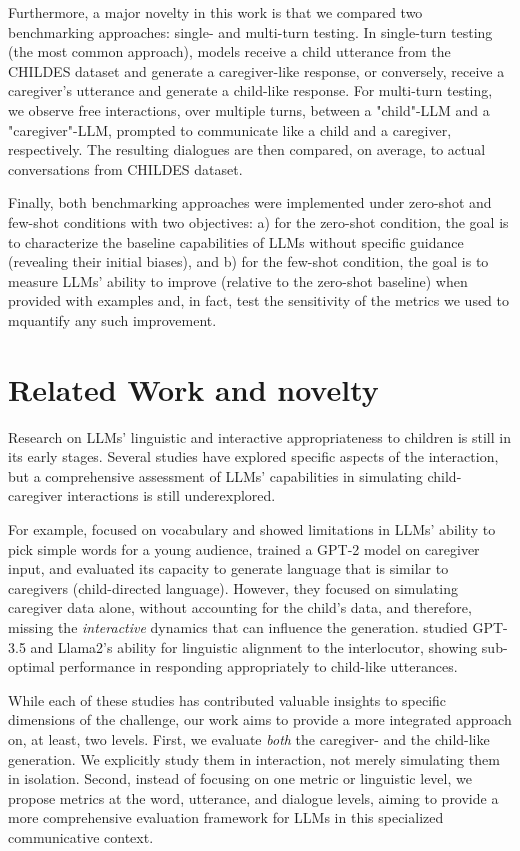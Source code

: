 Furthermore, a major novelty in this work is that we compared two benchmarking approaches: single- and multi-turn testing. In single-turn testing (the most common approach), models receive a child utterance from the CHILDES dataset and generate a caregiver-like response, or conversely, receive a caregiver's utterance and generate a child-like response. For multi-turn testing, we observe free interactions, over multiple turns, between a "child"-LLM and a "caregiver"-LLM, prompted to communicate like a child and a caregiver, respectively. The resulting dialogues are then compared, on average, to actual conversations from CHILDES dataset.

Finally, both benchmarking approaches were implemented under zero-shot and few-shot conditions with two objectives: a) for the zero-shot condition, the goal is to characterize the baseline capabilities of LLMs without specific guidance (revealing their initial biases), and b) for the few-shot condition, the goal is to measure LLMs' ability to improve (relative to the zero-shot baseline) when provided with examples and, in fact, test the sensitivity of the metrics we used to mquantify any such improvement.

\section{Related Work and novelty}

Research on LLMs' linguistic and interactive appropriateness to children is still in its early stages. Several studies have explored specific aspects of the interaction, but a comprehensive assessment of LLMs' capabilities in simulating child-caregiver interactions is still underexplored.

For example,  \citet{valentini2023automatic} focused on vocabulary and showed limitations in LLMs' ability to pick simple words for a young audience,
\citet{rasanen2024age} trained a GPT-2 model on caregiver input, and evaluated its capacity to generate language that is similar to caregivers (child-directed language). However, they focused on simulating caregiver data alone, without accounting for the child's data, and therefore, missing the \textit{interactive} dynamics that can influence the generation. \citet{french2024aligning} studied GPT-3.5 and Llama2's ability for linguistic alignment to the interlocutor, showing sub-optimal performance in responding appropriately to child-like utterances. 

While each of these studies has contributed valuable insights to specific dimensions of the challenge, our work aims to provide a more integrated approach on, at least, two levels. First, we evaluate \textit{both} the caregiver- and the child-like generation. We explicitly study them in interaction, not merely simulating them in isolation. Second, instead of focusing on one metric or linguistic level, we propose metrics at the word, utterance, and dialogue levels, aiming to provide a more comprehensive evaluation framework for LLMs in this specialized communicative context.

